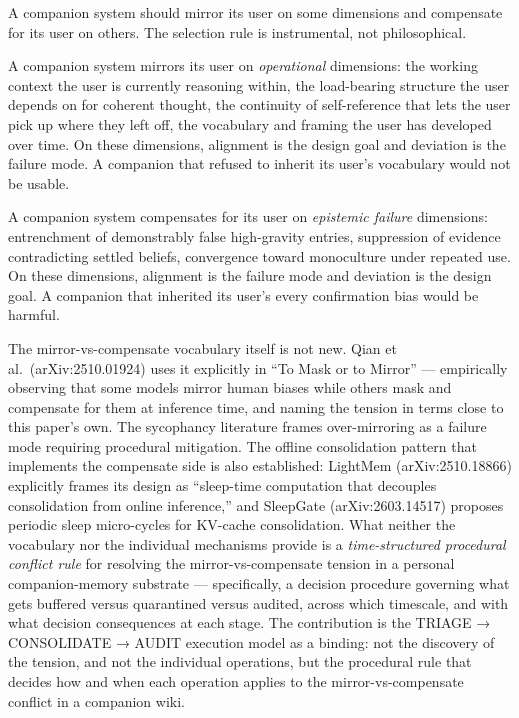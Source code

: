 \documentclass[
  11pt,
]{article}
\begin{document}
A companion system should mirror its user on some dimensions and
compensate for its user on others. The selection rule is instrumental,
not philosophical.

A companion system mirrors its user on \emph{operational} dimensions:
the working context the user is currently reasoning within, the
load-bearing structure the user depends on for coherent thought, the
continuity of self-reference that lets the user pick up where they left
off, the vocabulary and framing the user has developed over time. On
these dimensions, alignment is the design goal and deviation is the
failure mode. A companion that refused to inherit its user's vocabulary
would not be usable.

A companion system compensates for its user on \emph{epistemic failure}
dimensions: entrenchment of demonstrably false high-gravity entries,
suppression of evidence contradicting settled beliefs, convergence
toward monoculture under repeated use. On these dimensions, alignment is
the failure mode and deviation is the design goal. A companion that
inherited its user's every confirmation bias would be harmful.

The mirror-vs-compensate vocabulary itself is not new. Qian et
al.~(arXiv:2510.01924) uses it explicitly in ``To Mask or to Mirror''
--- empirically observing that some models mirror human biases while
others mask and compensate for them at inference time, and naming the
tension in terms close to this paper's own. The sycophancy literature
frames over-mirroring as a failure mode requiring procedural mitigation.
The offline consolidation pattern that implements the compensate side is
also established: LightMem (arXiv:2510.18866) explicitly frames its
design as ``sleep-time computation that decouples consolidation from
online inference,'' and SleepGate (arXiv:2603.14517) proposes periodic
sleep micro-cycles for KV-cache consolidation. What neither the
vocabulary nor the individual mechanisms provide is a
\emph{time-structured procedural conflict rule} for resolving the
mirror-vs-compensate tension in a personal companion-memory substrate
--- specifically, a decision procedure governing what gets buffered
versus quarantined versus audited, across which timescale, and with what
decision consequences at each stage. The contribution is the TRIAGE →
CONSOLIDATE → AUDIT execution model as a binding: not the discovery of
the tension, and not the individual operations, but the procedural rule
that decides how and when each operation applies to the
mirror-vs-compensate conflict in a companion wiki.
\end{document}
